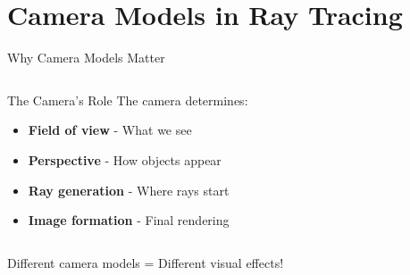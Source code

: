 \section{Camera Models in Ray Tracing}

\begin{frame}{Why Camera Models Matter}
    \begin{columns}
        \begin{column}{0.5\textwidth}
            \begin{conceptbox}{The Camera's Role}
                The camera determines:
                \begin{itemize}
                    \item \textbf{Field of view} - What we see
                    \item \textbf{Perspective} - How objects appear
                    \item \textbf{Ray generation} - Where rays start
                    \item \textbf{Image formation} - Final rendering
                \end{itemize}
            \end{conceptbox}
        \end{column}
        \begin{column}{0.5\textwidth}
        \end{column}
    \end{columns}

    \vspace{0.5cm}
    \begin{center}
        \alert{Different camera models = Different visual effects!}
    \end{center}
\end{frame}

